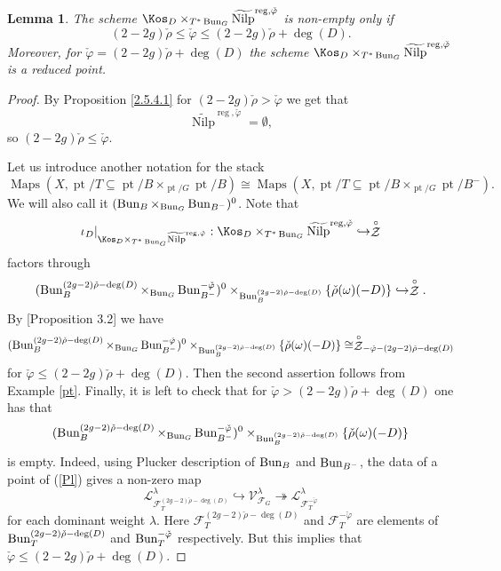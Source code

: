 \documentclass[9pt]{amsart}
\DeclareMathOperator{\pt}{{pt}}
\DeclareMathOperator{\reg}{{reg}}
\newcommand{\cF}{{\mathcal F}}
\newcommand{\cL}{{\mathcal L}}
\newcommand{\cV}{{\mathcal V}}
\newcommand{\cZ}{{\mathcal Z}}
\DeclareMathOperator{\Maps}{{Maps}}
\DeclareMathOperator{\Nilp}{{Nilp}} \DeclareMathOperator{\op}{{op}}
\newtheorem{lm}[subsubsection]{Lemma}
\numberwithin{equation}{section}
\begin{document}
\begin{lm}\label{non-empty intersections}
	The scheme $\Kos_D \times_{T^* \Bun_G} \widetilde{\Nilp}^{\reg, \check{\varphi}}$ is non-empty only if 
	$$(2-2g)\check{\rho} \leq \check{\varphi}\leq (2-2g)\check{\rho} + \deg(D).$$
	Moreover, for $\check{\varphi} = (2-2g)\check{\rho} + \deg(D)$ the scheme $\Kos_D \times_{T^* \Bun_G} \widetilde{\Nilp}^{\reg, \check{\varphi}}$ is a reduced point.
\end{lm}

\begin{proof}
	By Proposition \ref{2.5.4.1} for $(2-2g)\check{\rho} > \check{\varphi}$ we get that  $$\widetilde{\Nilp}^{\reg, \check{\varphi}} = \emptyset,$$
	so $(2-2g)\check{\rho} \leq \check{\varphi}$. 
	
	Let us introduce another notation for the stack $$\Maps(X, \pt/T \subseteq \pt/B \times_{\pt/G} \pt/B) \cong \Maps(X, \pt/T \subseteq \pt/B \times_{\pt/G} \pt/B^-).$$ We will also call it $(\operatorname{{Bun}}_B \times_{\operatorname{{Bun}}_{G}} \operatorname{{Bun}}_{B^-})^0$. Note that
	$${\iota_{D}}|_{\Kos_D \times_{T^* \Bun_G} \widetilde{\Nilp}^{\reg, \check{\varphi}}}: \Kos_D \times_{T^* \Bun_G} \widetilde{\Nilp}^{\reg, \check{\varphi}} \hookrightarrow \stackrel{\circ}{\cZ}$$
	factors through $$(\Bun_B^{(2g-2)\check{\rho} - \deg(D)} \times_{\Bun_{G}} \Bun_{B^-}^{-\check{\varphi}})^0 \times_{\Bun_B^{(2g-2)\check{\rho}  - \deg(D)}} \{\check{\rho}(\omega)(-D)\} \hookrightarrow  \stackrel{\circ}{\cZ} .$$
	By \cite{BFGM}[Proposition 3.2] we have
	$$(\Bun_B^{(2g-2)\check{\rho} - \deg(D) } \times_{\Bun_{G}} \Bun_{B^-}^{-\check{\varphi}})^0 \times_{\Bun_B^{(2g-2)\check{\rho}  - \deg(D)}} \{\check{\rho}(\omega)(-D)\}  \cong \stackrel{\circ}{\cZ}_{-\check{\varphi} - (2g-2)\check{\rho}  - \deg(D)}$$
	for $\check{\varphi} \leq (2-2g)\check{\rho} +\deg(D).$
	Then the second assertion follows from Example \ref{pt}.
	Finally, it is left to check that for $\check{\varphi} >(2-2g)\check{\rho} +\deg(D)$ one has  that
	\begin{equation}\label{Pl}
		(\operatorname{{Bun}}_B^{(2g-2)\check{\rho} - \deg(D) } \times_{\operatorname{{Bun}}_{G}} \operatorname{{Bun}}_{B^-}^{-\check{\varphi}})^0 \times_{\operatorname{{Bun}}_B^{(2g-2)\check{\rho}  - \deg(D)}} \{\check{\rho}(\omega)(-D)\}
	\end{equation}
		is empty. Indeed, using Plucker description of $\operatorname{{Bun}}_B$ and $\operatorname{{Bun}}_{B^-}$, the data of a point of (\ref{Pl}) gives a non-zero map 
		$$\cL^{\lambda}_{\cF_T^{(2g-2)\check{\rho}  - \deg(D)}} \hookrightarrow \cV^{\lambda}_{\cF_G} \twoheadrightarrow \cL^{\lambda}_{\cF_T^{-\check{\varphi}}}$$
		for each dominant weight $\lambda$. Here $\cF_T^{(2g-2)\check{\rho}  - \deg(D)}$ and $\cF_T^{-\check{\varphi}}$ are elements of $\operatorname{{Bun}}_T^{(2g-2)\check{\rho}  - \deg(D)}$ and $\operatorname{{Bun}}_T^{-\check{\varphi}}$ respectively. But this implies that $\check{\varphi} \leq (2-2g)\check{\rho} +\deg(D).$
\end{proof}
\end{document}
